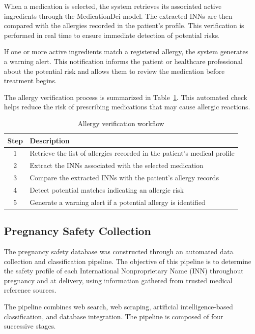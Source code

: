 When a medication is selected, the system retrieves its associated active ingredients through the MedicationDci model. The extracted INNs are then compared with the allergies recorded in the patient's profile. This verification is performed in real time to ensure immediate detection of potential risks.

If one or more active ingredients match a registered allergy, the system generates a warning alert. This notification informs the patient or healthcare professional about the potential risk and allows them to review the medication before treatment begins.

The allergy verification process is summarized in Table~\ref{tab:allergy_check}. This automated check helps reduce the risk of prescribing medications that may cause allergic reactions.
\begin{table}[H]
\centering
\caption{Allergy verification workflow}
\label{tab:allergy_check}
\begin{tabular}{|c|p{9cm}|}
\hline
\textbf{Step} & \textbf{Description} \\
\hline
1 & Retrieve the list of allergies recorded in the patient's medical profile \\
\hline
2 & Extract the INNs associated with the selected medication \\
\hline
3 & Compare the extracted INNs with the patient's allergy records \\
\hline
4 & Detect potential matches indicating an allergic risk \\
\hline
5 & Generate a warning alert if a potential allergy is identified \\
\hline
\end{tabular}
\end{table}


\subsection{Pregnancy Safety Collection}
\label{subsec:pregnancy_safety_pipeline}

The pregnancy safety database was constructed through an automated data collection and classification pipeline. The objective of this pipeline is to determine the safety profile of each International Nonproprietary Name (INN) throughout pregnancy and at delivery, using information gathered from trusted medical reference sources.

The pipeline combines web search, web scraping, artificial intelligence-based classification, and database integration. The pipeline is composed of four successive stages.

